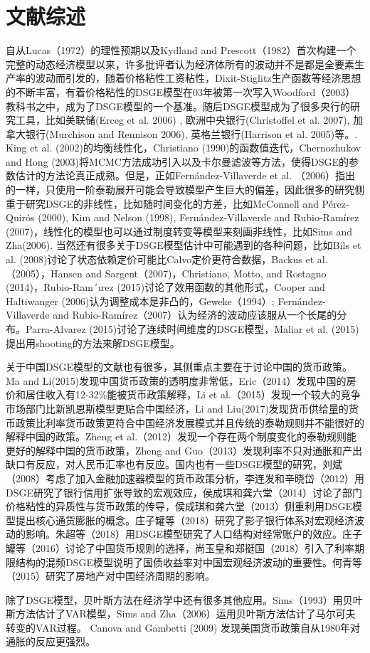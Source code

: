 \documentclass[12pt]{article}
\begin{document}
\section{文献综述}
自从Lucas（1972）的理性预期以及Kydland and Prescott（1982）首次构建一个完整的动态经济模型以来，许多批评者认为经济体所有的波动并不是都是全要素生产率的波动而引发的，随着价格粘性工资粘性，Dixit-Stiglitz生产函数等经济思想的不断丰富，有着价格粘性的DSGE模型在03年被第一次写入Woodford（2003）教科书之中，成为了DSGE模型的一个基准。随后DSGE模型成为了很多央行的研究工具，比如美联储(Erceg et al. 2006) , 欧洲中央银行(Christoffel et al. 2007), 加拿大银行(Murchison and Rennison 2006), 英格兰银行(Harrison
et al. 2005)等。. King et al. (2002)的均衡线性化，Christiano (1990)的函数值迭代，Chernozhukov and Hong (2003)将MCMC方法成功引入以及卡尔曼滤波等方法，使得DSGE的参数估计的方法论真正成熟。但是，正如Fernández-Villaverde et al. （2006）指出的一样，只使用一阶泰勒展开可能会导致模型产生巨大的偏差，因此很多的研究侧重于研究DSGE的非线性，比如随时间变化的方差，比如McConnell and Pérez-Quirós (2000), Kim and Nelson (1998), Fernández-Villaverde and Rubio-Ramírez (2007)，线性化的模型也可以通过制度转变等模型来刻画非线性，比如Sims and Zha(2006). 当然还有很多关于DSGE模型估计中可能遇到的各种问题，比如Bils et al. (2008)讨论了状态依赖定价可能比Calvo定价更符合数据，Backus et al. （2005），Hansen and Sargent（2007)，Christiano, Motto, and Rostagno (2014)，Rubio-Ram´ırez (2015)讨论了效用函数的其他形式，Cooper and Haltiwanger (2006)认为调整成本是非凸的，Geweke（1994）; Fernández-Villaverde and Rubio-Ramírez（2007）认为经济的波动应该服从一个长尾的分布。Parra-Alvarez (2015)讨论了连续时间维度的DSGE模型，Maliar et al. (2015)提出用shooting的方法来解DSGE模型。

关于中国DSGE模型的文献也有很多，其侧重点主要在于讨论中国的货币政策。Ma and Li(2015)发现中国货币政策的透明度非常低，Eric（2014）发现中国的房价和居住收入有12-32\%能被货币政策解释，Li et al.（2015）发现一个较大的竞争市场部门比新凯恩斯模型更贴合中国经济，Li and Liu(2017)发现货币供给量的货币政策比利率货币政策更符合中国经济发展模式并且传统的泰勒规则并不能很好的解释中国的政策。Zheng et al.（2012）发现一个存在两个制度变化的泰勒规则能更好的解释中国的货币政策，Zheng and Guo（2013）发现利率不只对通胀和产出缺口有反应，对人民币汇率也有反应。国内也有一些DSGE模型的研究，刘斌（2008）考虑了加入金融加速器模型的货币政策分析，李连发和辛晓岱（2012）用DSGE研究了银行信用扩张导致的宏观效应，侯成琪和龚六堂（2014）讨论了部门价格粘性的异质性与货币政策的传导，侯成琪和龚六堂（2013）侧重利用DSGE模型提出核心通货膨胀的概念。庄子罐等（2018）研究了影子银行体系对宏观经济波动的影响。朱超等（2018）用DSGE模型研究了人口结构对经常账户的效应。庄子罐等（2016）讨论了中国货币规则的选择，尚玉皇和郑挺国（2018）引入了利率期限结构的混频DSGE模型说明了国债收益率对中国宏观经济波动的重要性。何青等（2015）研究了房地产对中国经济周期的影响。

除了DSGE模型，贝叶斯方法在经济学中还有很多其他应用。Sims（1993）用贝叶斯方法估计了VAR模型，Sims and Zha（2006）运用贝叶斯方法估计了马尔可夫转变的VAR过程。 Canova and Gambetti (2009) 发现美国货币政策自从1980年对通胀的反应更强烈。
\end{document}
